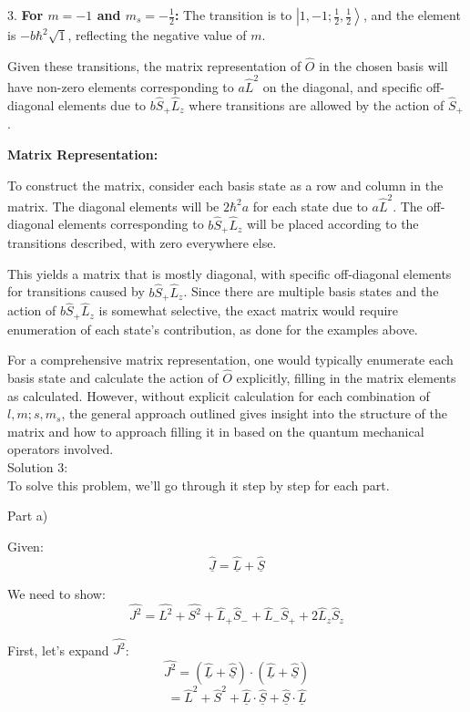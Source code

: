\documentclass[a4paper,11pt]{article}
\begin{document}
3. \textbf{For \( m = -1 \) and \( m_{s} = -\frac{1}{2} \):} The transition is to \( \left|1, -1; \frac{1}{2}, \frac{1}{2} \right> \), and the element is \( -b\hbar^2 \sqrt{1} \), reflecting the negative value of \( m \).

Given these transitions, the matrix representation of \( \hat{O} \) in the chosen basis will have non-zero elements corresponding to \( a\hat{L}^2 \) on the diagonal, and specific off-diagonal elements due to \( b\hat{S}_{+}\hat{L}_{z} \) where transitions are allowed by the action of \( \hat{S}_{+} \).

\textbf{Matrix Representation:}

To construct the matrix, consider each basis state as a row and column in the matrix. The diagonal elements will be \( 2\hbar^2a \) for each state due to \( a\hat{L}^2 \). The off-diagonal elements corresponding to \( b\hat{S}_{+}\hat{L}_{z} \) will be placed according to the transitions described, with zero everywhere else.

This yields a matrix that is mostly diagonal, with specific off-diagonal elements for transitions caused by \( b\hat{S}_{+}\hat{L}_{z} \). Since there are multiple basis states and the action of \( b\hat{S}_{+}\hat{L}_{z} \) is somewhat selective, the exact matrix would require enumeration of each state's contribution, as done for the examples above.

For a comprehensive matrix representation, one would typically enumerate each basis state and calculate the action of \( \hat{O} \) explicitly, filling in the matrix elements as calculated. However, without explicit calculation for each combination of \( l, m; s, m_{s} \), the general approach outlined gives insight into the structure of the matrix and how to approach filling it in based on the quantum mechanical operators involved. \\

\noindent Solution 3: \\

To solve this problem, we'll go through it step by step for each part.

Part a)

Given:
\[ \hat{\underline{J}} = \hat{\underline{L}} + \hat{\underline{S}} \]

We need to show:
\[ \hat{J^{2}} = \hat{L^{2}} + \hat{S^{2}} + \hat{L}_{+}\hat{S}_{-} + \hat{L}_{-}\hat{S}_{+} + 2\hat{L}_{z}\hat{S}_{z} \]

First, let's expand \(\hat{J^{2}}\):
\[ \hat{J^{2}} = (\hat{\underline{L}} + \hat{\underline{S}}) \cdot (\hat{\underline{L}} + \hat{\underline{S}}) \]
\[ = \hat{L}^2 + \hat{S}^2 + \hat{\underline{L}}\cdot\hat{\underline{S}} + \hat{\underline{S}}\cdot\hat{\underline{L}} \]
\end{document}
